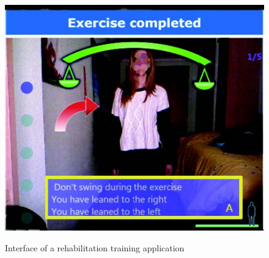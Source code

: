 \begin{figure}[htb]
\begin{minipage}[t]{0.49\linewidth}
		\includegraphics[width=1\linewidth]{Pictures/informationUIFeedbackSummary}
		\label{fig:informationUIFeedbackSummary}
	\end{minipage}
	\caption{Interface of a rehabilitation training application~\cite{Garrido2013-zs}}
	\label{fig:informationUIGarrido}
\end{figure}

